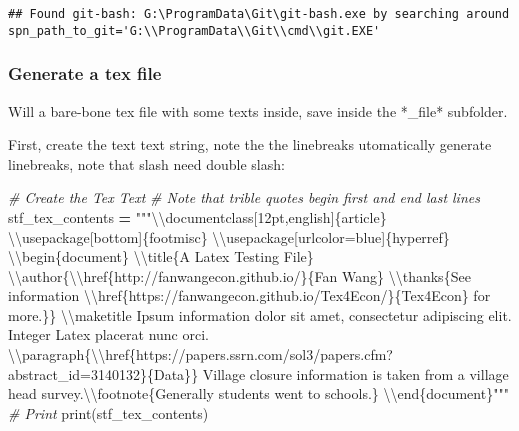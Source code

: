 \documentclass[
]{book}
\newenvironment{Shaded}{\begin{snugshade}}{\end{snugshade}}
\newcommand{\BuiltInTok}[1]{#1}
\newcommand{\CharTok}[1]{\textcolor[rgb]{0.31,0.60,0.02}{#1}}
\newcommand{\CommentTok}[1]{\textcolor[rgb]{0.56,0.35,0.01}{\textit{#1}}}
\newcommand{\NormalTok}[1]{#1}
\newcommand{\OperatorTok}[1]{\textcolor[rgb]{0.81,0.36,0.00}{\textbf{#1}}}
\newcommand{\SpecialCharTok}[1]{\textcolor[rgb]{0.00,0.00,0.00}{#1}}
\newcommand{\StringTok}[1]{\textcolor[rgb]{0.31,0.60,0.02}{#1}}
\begin{document}
\begin{verbatim}
## Found git-bash: G:\ProgramData\Git\git-bash.exe by searching around spn_path_to_git='G:\\ProgramData\\Git\\cmd\\git.EXE'
\end{verbatim}

\hypertarget{generate-a-tex-file}{%
\subsubsection{Generate a tex file}\label{generate-a-tex-file}}

Will a bare-bone tex file with some texts inside, save inside the *\_file* subfolder.

First, create the text text string, note the the linebreaks utomatically generate linebreaks, note that slash need double slash:

\begin{Shaded}
\begin{Highlighting}[]
\CommentTok{\# Create the Tex Text}
\CommentTok{\# Note that trible quotes begin first and end last lines}
\NormalTok{stf\_tex\_contents }\OperatorTok{=} \StringTok{"""}\CharTok{\textbackslash{}\textbackslash{}}\StringTok{documentclass[12pt,english]}\SpecialCharTok{\{article\}}
\CharTok{\textbackslash{}\textbackslash{}}\StringTok{usepackage[bottom]}\SpecialCharTok{\{footmisc\}}
\CharTok{\textbackslash{}\textbackslash{}}\StringTok{usepackage[urlcolor=blue]}\SpecialCharTok{\{hyperref\}}
\CharTok{\textbackslash{}\textbackslash{}}\StringTok{begin}\SpecialCharTok{\{document\}}
\CharTok{\textbackslash{}\textbackslash{}}\StringTok{title\{A Latex Testing File\}}
\CharTok{\textbackslash{}\textbackslash{}}\StringTok{author\{}\CharTok{\textbackslash{}\textbackslash{}}\StringTok{href\{http://fanwangecon.github.io/\}\{Fan Wang\} }\CharTok{\textbackslash{}\textbackslash{}}\StringTok{thanks\{See information }\CharTok{\textbackslash{}\textbackslash{}}\StringTok{href\{https://fanwangecon.github.io/Tex4Econ/\}}\SpecialCharTok{\{Tex4Econ\}}\StringTok{ for more.}\SpecialCharTok{\}\}}
\CharTok{\textbackslash{}\textbackslash{}}\StringTok{maketitle}
\StringTok{Ipsum information dolor sit amet, consectetur adipiscing elit. Integer Latex placerat nunc orci.}
\CharTok{\textbackslash{}\textbackslash{}}\StringTok{paragraph\{}\CharTok{\textbackslash{}\textbackslash{}}\StringTok{href\{https://papers.ssrn.com/sol3/papers.cfm?abstract\_id=3140132\}}\SpecialCharTok{\{Data\}}\StringTok{\}}
\StringTok{Village closure information is taken from a village head survey.}\CharTok{\textbackslash{}\textbackslash{}}\StringTok{footnote\{Generally students went to schools.\}}
\CharTok{\textbackslash{}\textbackslash{}}\StringTok{end}\SpecialCharTok{\{document\}}\StringTok{"""}
\CommentTok{\# Print}
\BuiltInTok{print}\NormalTok{(stf\_tex\_contents)}
\end{Highlighting}
\end{Shaded}
\end{document}
